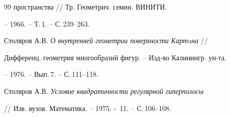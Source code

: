 \begin{thebibliography}{99}
{пространства} // Тр. Геометрич. семин. ВИНИТИ. 


-- 1966. -- Т.\,1. -- С.\,239--263. 




Столяров А.В. {\em О внутренней геометрии поверхности Картaна} // 


Дифференц. геометрия многообразий фигур. -- Изд-во Калинингр. ун-та. 


-- 1976. -- Вып.\,7. -- С.\,111--118. 




Столяров А.В. {\em Условие квадратичности регулярной гиперполосы} 


// Изв. вузов. Математика. -- 1975. - \No\,11. -- С.\,106--108. 


 


\end{thebibliography} 


 


\vskip 2cm 


 






 


\label{end} 


 


 


